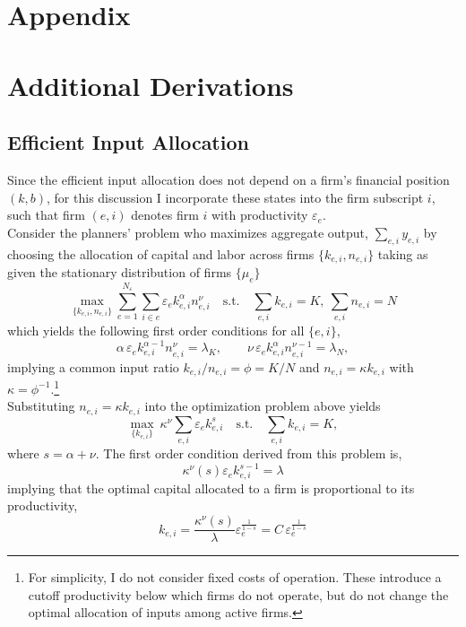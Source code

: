 \documentclass[12pt]{article}
\begin{document}
\setcounter{figure}{0}
\renewcommand{\thefigure}{A\arabic{figure}}

\section*{Appendix  \label{sec: mathapp}}



\section{Additional Derivations}
\subsection{Efficient Input Allocation  \label{sec: efficient allocation}}
Since the efficient input allocation does not depend on a firm's financial position $(k,b)$, for this discussion I incorporate these states into the firm subscript $i$, such that firm $(e,i)$ denotes firm $i$ with productivity $\varepsilon_e$.\vspace{3mm} \\
Consider the planners' problem who maximizes aggregate output, $\sum_{e,i} y_{e,i}$ by choosing the allocation of capital and labor across firms $\{k_{e,i},n_{e,i}\}$ taking as given the stationary distribution of firms $\{\mu_e\}$
$$
\max_{\{k_{e,i},n_{e,i}\}} \sum_{e=1}^{N_\varepsilon}\sum_{i\in e}\varepsilon_e k_{e,i}^{\alpha}n_{e,i}^{\nu}
\quad\text{s.t.}\quad \sum_{e,i}k_{e,i}=K,\ \sum_{e,i}n_{e,i}=N $$ 
which yields the following first order conditions for all $\{e,i\}$,
\[
\alpha\,\varepsilon_e k_{e,i}^{\alpha-1}n_{e,i}^{\nu}=\lambda_K,\qquad
\nu\,\varepsilon_e k_{e,i}^{\alpha}n_{e,i}^{\nu-1}=\lambda_N,
\]
implying a common input ratio $k_{e,i}/n_{e,i}=\phi=K/N$ and $n_{e,i}=\kappa k_{e,i}$ with $\kappa=\phi^{-1}$.\footnote{For simplicity, I do not consider fixed costs of operation. These introduce a cutoff productivity below which firms do not operate, but do not change the optimal allocation of inputs among active firms.} \\
Substituting $n_{e,i}=\kappa k_{e,i}$ into the optimization problem above yields
\[
\max_{\{k_{e,i}\}}\ \kappa^{\nu}\sum_{e,i}\varepsilon_e k_{e,i}^{s}\quad\text{s.t.}\quad \sum_{e,i}k_{e,i}=K,
\]
where $s = \alpha + \nu$. The first order condition derived from this problem is, 
$$ \kappa^{\nu} (s) \varepsilon_e k_{e,i}^{s - 1} = \lambda $$
implying that the optimal capital allocated to a firm is proportional to its productivity,
$$ k_{e,i} = \frac{\kappa^{\nu} (s)}{\lambda} \varepsilon_e^{\frac{1}{1-s}} =  C\,\varepsilon_e^{\frac{1}{1-s}} $$ 
\end{document}
